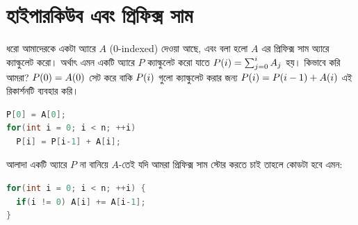 \section{হাইপারকিউব এবং প্রিফিক্স সাম}
ধরো আমাদেরকে একটা অ্যারে $A$ (0-indexed) দেওয়া আছে, এবং বলা হলো $A$ এর
প্রিফিক্স সাম অ্যারে ক্যাল্কুলেট করো। অর্থাৎ এমন একটি অ্যারে $P$ ক্যাল্কুলেট
করো যাতে $P(i) = \sum_{j=0}^{i} A_j$ হয়। কিভাবে করি আমরা? $P(0) =
A(0)$ সেট করে বাকি $P(i)$ গুলো ক্যাল্কুলেট করার জন্য $P(i) =
P(i-1) + A(i)$ এই রিকার্শনটি ব্যবহার করি।
\begin{lstlisting}[language=C++]
P[0] = A[0];
for(int i = 0; i < n; ++i)
  P[i] = P[i-1] + A[i];
\end{lstlisting}
আলাদা একটি অ্যারে $P$ না বানিয়ে $A$-তেই যদি আমরা প্রিফিক্স সাম স্টোর করতে চাই
তাহলে কোডটা হবে এমন:
\begin{lstlisting}[language=C++]
for(int i = 0; i < n; ++i) {
  if(i != 0) A[i] += A[i-1];
}
\end{lstlisting}

